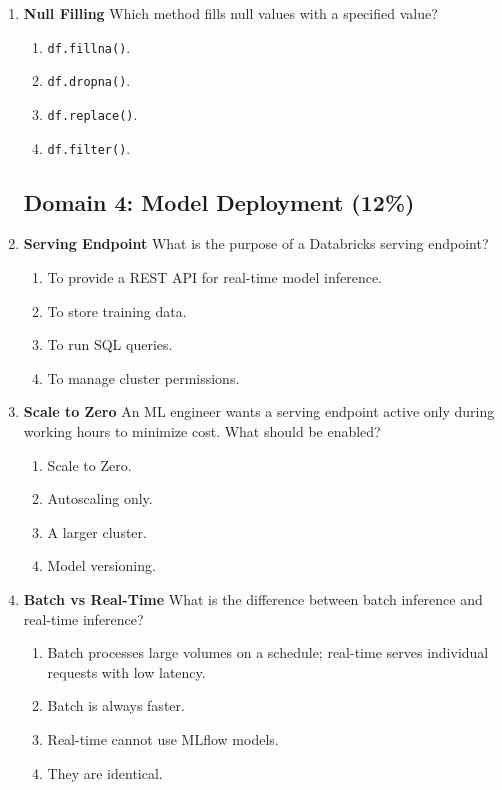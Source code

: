 \documentclass{article}
\begin{document}
\begin{enumerate}[label=\textbf{Q\arabic*.}]
		\item \textbf{Null Filling}
		Which method fills null values with a specified value?
		\begin{enumerate}[label=\Alph*.]
			\item \texttt{df.fillna()}.
			\item \texttt{df.dropna()}.
			\item \texttt{df.replace()}.
			\item \texttt{df.filter()}.
		\end{enumerate}
		
		\subsection*{Domain 4: Model Deployment (12\%)}
		
		\item \textbf{Serving Endpoint}
		What is the purpose of a Databricks serving endpoint?
		\begin{enumerate}[label=\Alph*.]
			\item To provide a REST API for real-time model inference.
			\item To store training data.
			\item To run SQL queries.
			\item To manage cluster permissions.
		\end{enumerate}
		
		\item \textbf{Scale to Zero}
		An ML engineer wants a serving endpoint active only during working hours to minimize cost. What should be enabled?
		\begin{enumerate}[label=\Alph*.]
			\item Scale to Zero.
			\item Autoscaling only.
			\item A larger cluster.
			\item Model versioning.
		\end{enumerate}
		
		\item \textbf{Batch vs Real-Time}
		What is the difference between batch inference and real-time inference?
		\begin{enumerate}[label=\Alph*.]
			\item Batch processes large volumes on a schedule; real-time serves individual requests with low latency.
			\item Batch is always faster.
			\item Real-time cannot use MLflow models.
			\item They are identical.
		\end{enumerate}
		

\end{enumerate}
\end{document}
